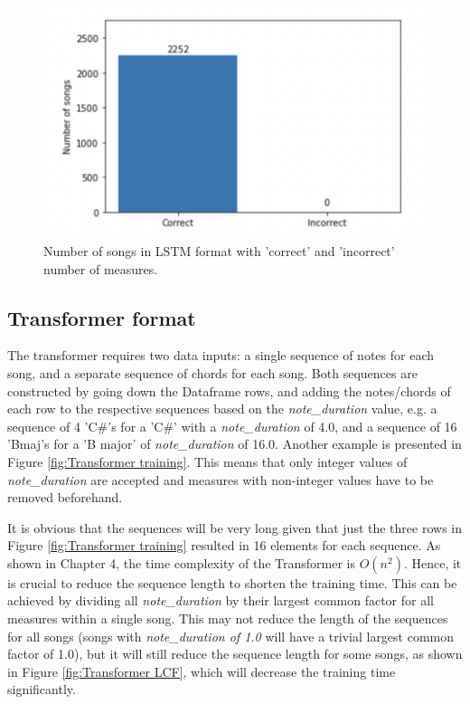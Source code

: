 \begin{figure}
    \centering
    \includegraphics{Figures/LSTM check}
    \decoRule
    \caption{Number of songs in LSTM format with 'correct' and 'incorrect' number of measures.}
    \label{fig:LSTM check}
    \end{figure}

\subsection{Transformer format}
\label{Transformer format for training}
The transformer requires two data inputs: a single sequence of notes for each song, and a separate sequence of chords for each song. Both sequences are constructed by going down the Dataframe rows, and adding the notes/chords of each row to the respective sequences based on the \emph{note\_duration} value, e.g. a sequence of 4 'C\#'s for a 'C\#' with a \emph{note\_duration} of 4.0, and a sequence of 16 'Bmaj's for a 'B major' of \emph{note\_duration} of 16.0. Another example is presented in Figure \ref{fig:Transformer training}. This means that only integer values of \emph{note\_duration} are accepted and measures with non-integer values have to be removed beforehand.

It is obvious that the sequences will be very long given that just the three rows in Figure \ref{fig:Transformer training} resulted in 16 elements for each sequence. As shown in Chapter 4, the time complexity of the Transformer is $O({n}^2)$. Hence, it is crucial to reduce the sequence length to shorten the training time. This can be achieved by dividing all \emph{note\_duration} by their largest common factor for all measures within a single song. This may not reduce the length of the sequences for all songs (songs with \emph{note\_duration of 1.0} will have a trivial largest common factor of 1.0), but it will still reduce the sequence length for some songs, as shown in Figure \ref{fig:Transformer LCF}, which will decrease the training time significantly.


